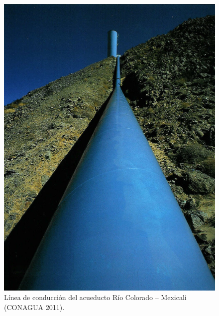\documentclass[letterpaper]{report}
\begin{document}
\newpage
\vspace*{2cm}
\begin{figure}[H]
	\centering
	\includegraphics[width=0.8\linewidth]{fig6}
	\caption{Línea de conducción del acueducto Río Colorado – Mexicali (CONAGUA 2011).}
	\label{fig:fig6}
\end{figure}
\end{document}
